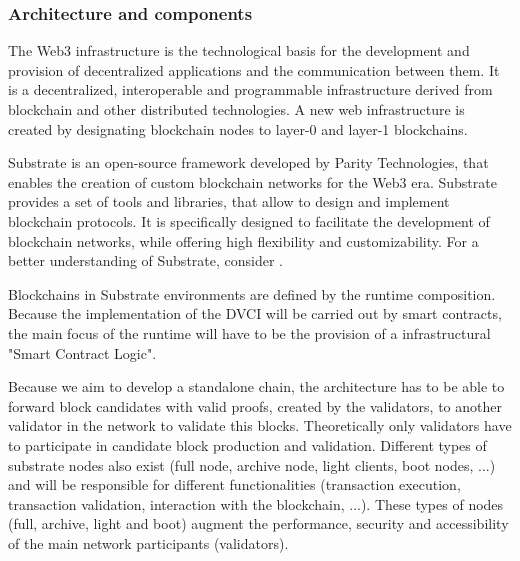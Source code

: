 \documentclass[]{article}
\begin{document}
\subsubsection{Architecture and components}
The Web3 infrastructure is the technological basis for the development and provision of decentralized applications and the communication between them. 
It is a decentralized, interoperable and programmable infrastructure derived from blockchain and other distributed technologies.
A new web infrastructure is created by designating blockchain nodes to layer-0 and layer-1 blockchains.

Substrate is an open-source framework developed by Parity Technologies, that enables the creation of custom blockchain networks for the Web3 era.
Substrate provides a set of tools and libraries, that allow to design and implement blockchain protocols.
It is specifically designed to facilitate the development of blockchain networks, while offering high flexibility and customizability. 
For a better understanding of Substrate, consider \cite{SubstrateDoc}.

Blockchains in Substrate environments are defined by the runtime composition. 
Because the implementation of the DVCI will be carried out by smart contracts, the main focus of the runtime will have to be the provision of a infrastructural "Smart Contract Logic".

Because we aim to develop a standalone chain, the architecture has to be able to forward block candidates with valid proofs, created by the validators, to another validator in the network to validate this blocks. 
Theoretically only validators have to participate in candidate block production and validation. 
Different types of substrate nodes also exist (full node, archive node, light clients, boot nodes, ...) and will be responsible for different functionalities (transaction execution, transaction validation, interaction with the blockchain, ...).
These types of nodes (full, archive, light and boot) augment the performance, security and accessibility of the main network participants (validators).
\end{document}
